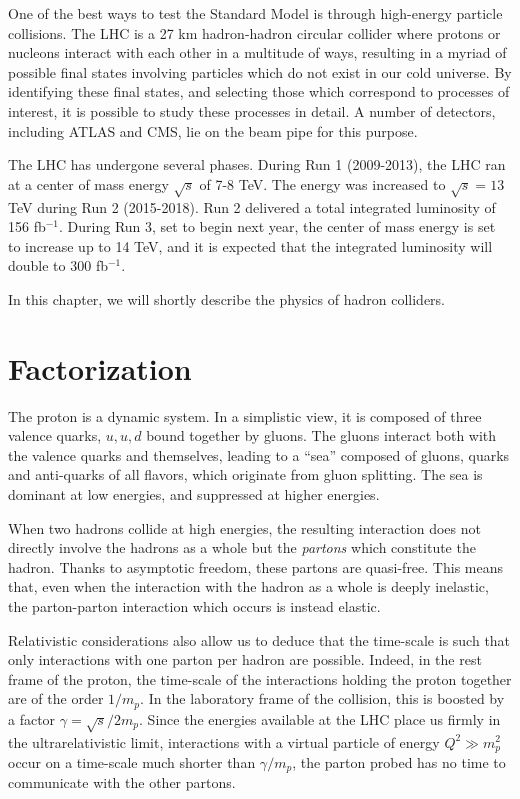 \documentclass[10pt,a4paper]{book}
\begin{document}
One of the best ways to test the Standard Model is through high-energy particle collisions. The LHC is a 27 km hadron-hadron circular collider where protons or nucleons interact with each other in a multitude of ways, resulting in a myriad of possible final states involving particles which do not exist in our cold universe. By identifying these final states, and selecting those which correspond to processes of interest, it is possible to study these processes in detail. A number of detectors, including ATLAS and CMS, lie on the beam pipe for this purpose.

The LHC has undergone several phases. During Run 1 (2009-2013), the LHC ran at a center of mass energy $\sqrt{s}$ of 7-8 TeV. The energy was increased to $\sqrt{s} = 13$ TeV during Run 2 (2015-2018). 
Run 2 delivered a total integrated luminosity of 156 fb$^{-1}$. During Run 3, set to begin next year, the center of mass energy is set to increase up to 14 TeV, and it is expected that the integrated luminosity will double to 300 fb$^{-1}$. 

In this chapter, we will shortly describe the physics of hadron colliders.

\section{Factorization}

  
The proton is a dynamic system. In a simplistic view, it is composed of three valence quarks, $u, u, d$ bound together by gluons. The gluons interact both with the valence quarks and themselves, leading to a ``sea'' composed of gluons, quarks and anti-quarks of all flavors, which originate from gluon splitting. The sea is dominant at low energies, and suppressed at higher energies. 

When two hadrons collide at high energies, the resulting interaction does not directly involve the hadrons as a whole but the \emph{partons} which constitute the hadron. Thanks to asymptotic freedom, these partons are quasi-free. This means that, even when the interaction with the hadron as a whole is deeply inelastic, the parton-parton interaction which occurs is instead elastic. 

Relativistic considerations also allow us to deduce that the time-scale is such that only interactions with one parton per hadron are possible. Indeed, in the rest frame of the proton, the time-scale of the interactions holding the proton together are of the order $1/m_p$. In the laboratory frame of the collision, this is boosted by a factor $\gamma = \sqrt{s}/2m_p$. Since the energies available at the LHC place us firmly in the ultrarelativistic limit, interactions with a virtual particle of energy $Q^2 \gg m_p^2$ occur on a time-scale much shorter than $\gamma/m_p$, the parton probed has no time to communicate with the other partons.
\end{document}
